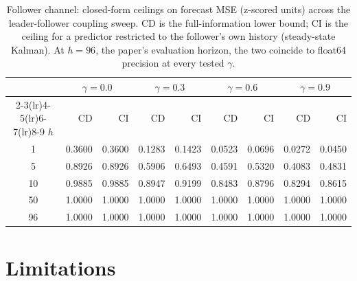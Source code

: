 \documentclass[10pt]{article} %
\begin{document}
    \begin{table}[htbp]
        \centering
        \caption{Follower channel: closed-form ceilings on forecast MSE (z-scored units) across the leader-follower
            coupling sweep. CD is the full-information lower bound; CI is the ceiling for a predictor restricted to the
            follower's own history (steady-state Kalman). At $h = 96$, the paper's evaluation horizon, the two coincide
            to float64 precision at every tested $\gamma$.}
        \label{tab:theoretical_bounds}
        \small
        \setlength{\tabcolsep}{5pt}
        \begin{tabular}{crrrrrrrr}
            \toprule
            & \multicolumn{2}{c}{$\gamma = 0.0$} & \multicolumn{2}{c}{$\gamma = 0.3$} & \multicolumn{2}{c}{$\gamma = 0.6$} & \multicolumn{2}{c}{$\gamma = 0.9$} \\
            \cmidrule(lr){2-3}\cmidrule(lr){4-5}\cmidrule(lr){6-7}\cmidrule(lr){8-9}
            $h$ & CD & CI & CD & CI & CD & CI & CD & CI \\
            \midrule
            1   & 0.3600 & 0.3600 & 0.1283 & 0.1423 & 0.0523 & 0.0696 & 0.0272 & 0.0450 \\
            5   & 0.8926 & 0.8926 & 0.5906 & 0.6493 & 0.4591 & 0.5320 & 0.4083 & 0.4831 \\
            10  & 0.9885 & 0.9885 & 0.8947 & 0.9199 & 0.8483 & 0.8796 & 0.8294 & 0.8615 \\
            50  & 1.0000 & 1.0000 & 1.0000 & 1.0000 & 1.0000 & 1.0000 & 1.0000 & 1.0000 \\
            96  & 1.0000 & 1.0000 & 1.0000 & 1.0000 & 1.0000 & 1.0000 & 1.0000 & 1.0000 \\
            \bottomrule
        \end{tabular}
    \end{table}


    \section{Limitations}
    \label{sec:limitations}
\end{document}
